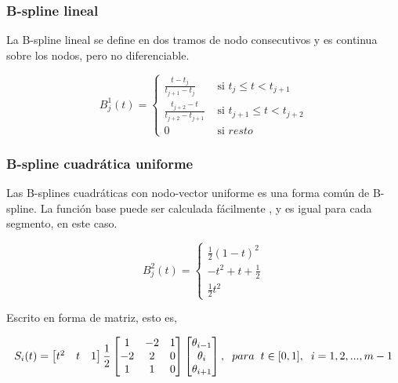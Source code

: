 \documentclass[
  12pt,
]{krantz}
\begin{document}
\hypertarget{b-spline-lineal}{%
\subsubsection{B-spline lineal}\label{b-spline-lineal}}

La B-spline lineal se define en dos tramos de nodo consecutivos y es continua sobre los nodos, pero no diferenciable.

\[
B_{j}^{1}(t) = \left\{
\begin{array}{ll}
\frac{t-t_{j}}{t_{j+1}-t_{j}} &  \text{ si } t_{j}  \leq  t < t_{j+1} \\
\frac{t_{j+2}-t}{t_{j+2}-t_{j+1}}    & \text{ si }  t_{j+1}  \leq  t < t_{j+2} \\
0 &  \text{ si } resto
\end{array}
\right.
\]

\hypertarget{b-spline-cuadratica-uniforme}{%
\subsubsection{B-spline cuadrática uniforme}\label{b-spline-cuadratica-uniforme}}

Las B-splines cuadráticas con nodo-vector uniforme es una forma común de B-spline. La función base puede ser calculada fácilmente , y es igual para cada segmento, en este caso.

\[
B_{j}^{2}(t) = \left\{
\begin{array}{ll}
\frac{1}{2} (1-t)^2 \\
-t^2+t+\frac{1}{2} \\
\frac{1}{2} t^2
\end{array}
\right.
\]

Escrito en forma de matriz, esto es,

\[\displaystyle{S_{i}(t) = \begin{bmatrix} t^2 & t & 1  \end{bmatrix} \frac{1}{2} \begin{bmatrix} 1 & -2 & 1\\ -2 & 2 & 0  \\ 1 & 1 & 0 \end{bmatrix} \begin{bmatrix}  \theta_{i-1} \\ \theta_{i} \\ \theta_{i+1}  \end{bmatrix} , \hspace{0.2cm} para \hspace{0.2cm} t \in [0,1],\hspace{0.2cm}  i=1,2,...,m-1 }\]
\end{document}
